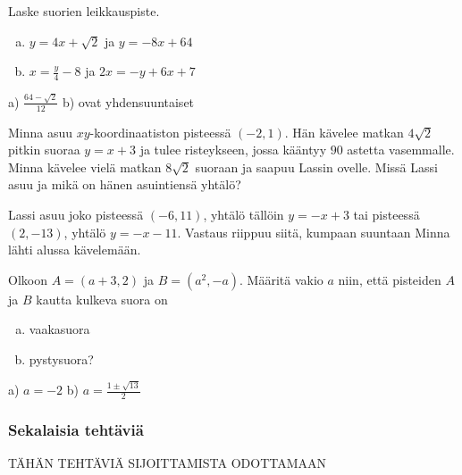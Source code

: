\begin{tehtavasivu}
\begin {tehtava}
Laske suorien leikkauspiste.
\begin{enumerate} [a)]
\item $y=4x+\sqrt{2}$ ja $y=-8x+64$
\item $x=\frac{y}{4}-8$ ja $2x=-y+6x+7$
\end{enumerate}
\begin {vastaus}
a) $\frac{64-\sqrt{2}}{12}$ b) ovat yhdensuuntaiset
\end {vastaus}
\end {tehtava}

\begin {tehtava}
Minna asuu $xy$-koordinaatiston pisteessä $(-2, 1)$. Hän kävelee matkan $4\sqrt{2}$ pitkin suoraa $y=x+3$ ja tulee risteykseen, jossa kääntyy $90$ astetta vasemmalle. Minna kävelee vielä matkan $8\sqrt{2}$ suoraan ja saapuu Lassin ovelle. Missä Lassi asuu ja mikä on hänen asuintiensä yhtälö?
\begin {vastaus}
Lassi asuu joko pisteessä $(-6, 11)$, yhtälö tällöin $y=-x+3$ tai pisteessä $(2, -13)$, yhtälö $y=-x-11$. Vastaus riippuu siitä, kumpaan suuntaan Minna lähti alussa kävelemään.
\end {vastaus}
\end {tehtava}

\begin {tehtava}
Olkoon $A=(a+3, 2)$ ja $B=(a^2, -a)$. Määritä vakio $a$ niin, että pisteiden $A$ ja $B$ kautta kulkeva suora on
\begin{enumerate} [a)]
\item vaakasuora
\item pystysuora?
\end{enumerate}
\begin {vastaus}
a) $a=-2$ b) $a=\frac{1\pm\sqrt{13}}{2} $
\end {vastaus}
\end {tehtava}

\subsubsection*{Sekalaisia tehtäviä}

TÄHÄN TEHTÄVIÄ SIJOITTAMISTA ODOTTAMAAN

\end{tehtavasivu}


